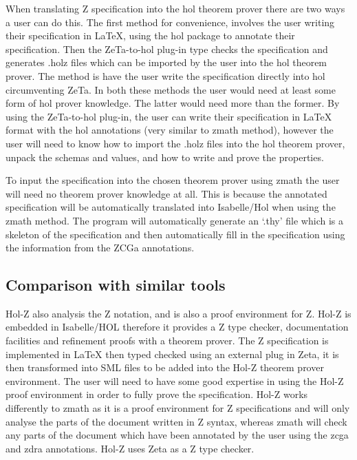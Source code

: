 When translating Z specification into the \gls{hol} theorem prover there are two
ways a user can do this. The first method for convenience, involves the user
writing their specification in \LaTeX{}, using the \gls{hol} package to annotate
their specification. Then the ZeTa-to-\gls{hol} plug-in type checks the
specification and generates .holz files which can be imported by the user into
the \gls{hol} theorem prover. The method is have the user write the
specification directly into \gls{hol} circumventing ZeTa. In both these methods
the user would need at least some form of \gls{hol} prover knowledge. The latter
would need more than the former. By using the ZeTa-to-\gls{hol} plug-in, the
user can write their specification in \LaTeX{} format with the \gls{hol}
annotations (very similar to \gls{zmath} method), however the user will need to
know how to import the .holz files into the \gls{hol} theorem prover, unpack the
schemas and values, and how to write and prove the properties.

To input the specification into the chosen theorem prover using \gls{zmath} the
user will need no theorem prover knowledge at all. This is because the annotated
specification will be automatically translated into Isabelle/Hol when using the
\gls{zmath} method. The program will automatically generate an `.thy' file which
is a skeleton of the specification and then automatically fill in the
specification using the information from the ZCGa annotations.

\subsection{Comparison with similar tools}
\label{subsec:provingSystemsForZ}

Hol-Z \cite{hol-z} also analysis the Z notation, and is also a
proof environment for Z. Hol-Z is embedded in Isabelle/HOL therefore it provides
a Z type checker, documentation facilities and refinement proofs with a theorem
prover. The Z specification is implemented in \LaTeX{} then typed checked using
an external plug in Zeta, it is then transformed into SML files to be added into
the Hol-Z theorem prover environment. The user will need to have some good
expertise in using the Hol-Z proof environment in order to fully prove the
specification. Hol-Z works differently to \gls{zmath} as it is a proof
environment for Z specifications and will only analyse the parts of the document
written in Z syntax, whereas \gls{zmath} will check any parts of the document
which have been annotated by the user using the \gls{zcga} and \gls{zdra}
annotations. Hol-Z uses Zeta \cite{zeta} as a Z type checker.

